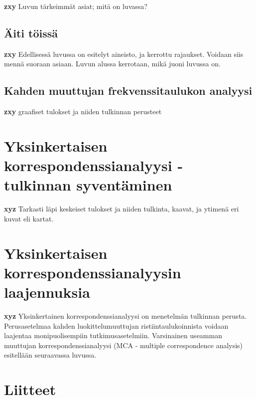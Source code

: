 \documentclass[finnish,]{book}
\theoremstyle{definition}
\theoremstyle{definition}
\theoremstyle{definition}
\theoremstyle{remark}
\begin{document}
\textbf{zxy} Luvun tärkeimmät asiat; mitä on luvassa?

\hypertarget{aiti-toissa}{%
\section{Äiti töissä}\label{aiti-toissa}}

\textbf{zxy} Edellisessä luvussa on esitelyt aineisto, ja kerrottu
rajaukset. Voidaan siis mennä suoraan asiaan. Luvun alussa kerrotaan,
mikä juoni luvussa on.

\hypertarget{kahden-muuttujan-frekvenssitaulukon-analyysi}{%
\section{Kahden muuttujan frekvenssitaulukon
analyysi}\label{kahden-muuttujan-frekvenssitaulukon-analyysi}}

\textbf{zxy} graafiset tulokset ja niiden tulkinnan perusteet

\hypertarget{yksinkertaisen-korrespondenssianalyysi---tulkinnan-syventaminen}{%
\chapter{Yksinkertaisen korrespondenssianalyysi - tulkinnan
syventäminen}\label{yksinkertaisen-korrespondenssianalyysi---tulkinnan-syventaminen}}

\textbf{xyz} Tarkasti läpi keskeiset tulokset ja niiden tulkinta,
kaavat, ja ytimenä eri kuvat eli kartat.

\hypertarget{yksinkertaisen-korrespondenssianalyysin-laajennuksia}{%
\chapter{Yksinkertaisen korrespondenssianalyysin
laajennuksia}\label{yksinkertaisen-korrespondenssianalyysin-laajennuksia}}

\textbf{xyz} Yksinkertainen korrespondenssianalyysi on menetelmän
tulkinnan perusta. Perusasetelmaa kahden luokittelumuuttujan
ristiintaulukoinnista voidaan laajentaa monipuolisempiin
tutkimusasetelmiin. Varsinainen useamman muuttujan
korrespondenssianalyysi (MCA - multiple correspondence analysis)
esitellään seuraavassa luvussa.

\hypertarget{liitteet}{%
\chapter*{Liitteet}\label{liitteet}}
\end{document}
